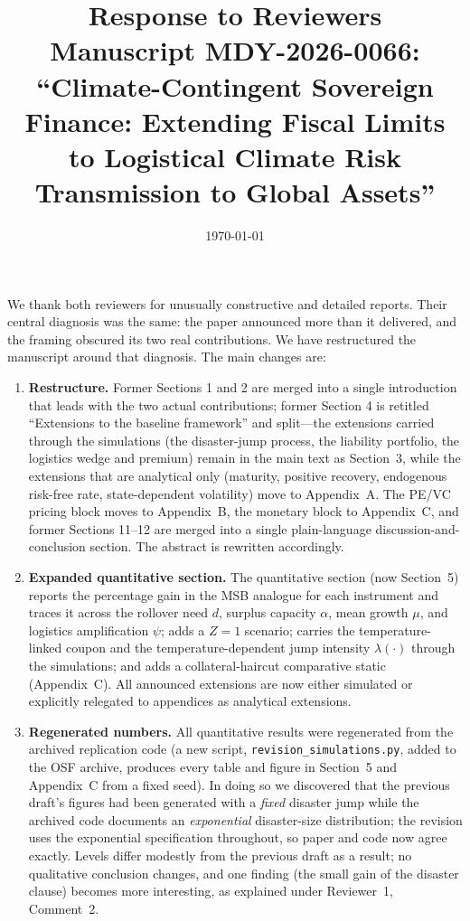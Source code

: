 \documentclass[11pt]{article}
\title{Response to Reviewers \\ \large Manuscript MDY-2026-0066: ``Climate-Contingent Sovereign Finance: Extending Fiscal Limits to Logistical Climate Risk Transmission to Global Assets''}
\date{\today}
\begin{document}
\maketitle

We thank both reviewers for unusually constructive and detailed reports. Their central diagnosis was the same: the paper announced more than it delivered, and the framing obscured its two real contributions. We have restructured the manuscript around that diagnosis. The main changes are:

\begin{enumerate}
\item \textbf{Restructure.} Former Sections 1 and 2 are merged into a single introduction that leads with the two actual contributions; former Section 4 is retitled ``Extensions to the baseline framework'' and split---the extensions carried through the simulations (the disaster-jump process, the liability portfolio, the logistics wedge and premium) remain in the main text as Section~3, while the extensions that are analytical only (maturity, positive recovery, endogenous risk-free rate, state-dependent volatility) move to Appendix~A. The PE/VC pricing block moves to Appendix~B, the monetary block to Appendix~C, and former Sections 11--12 are merged into a single plain-language discussion-and-conclusion section. The abstract is rewritten accordingly.
\item \textbf{Expanded quantitative section.} The quantitative section (now Section~5) reports the percentage gain in the MSB analogue for each instrument and traces it across the rollover need $d$, surplus capacity $\alpha$, mean growth $\mu$, and logistics amplification $\psi$; adds a $Z=1$ scenario; carries the temperature-linked coupon and the temperature-dependent jump intensity $\lambda(\cdot)$ through the simulations; and adds a collateral-haircut comparative static (Appendix~C). All announced extensions are now either simulated or explicitly relegated to appendices as analytical extensions.
\item \textbf{Regenerated numbers.} All quantitative results were regenerated from the archived replication code (a new script, \texttt{revision\_simulations.py}, added to the OSF archive, produces every table and figure in Section~5 and Appendix~C from a fixed seed). In doing so we discovered that the previous draft's figures had been generated with a \emph{fixed} disaster jump while the archived code documents an \emph{exponential} disaster-size distribution; the revision uses the exponential specification throughout, so paper and code now agree exactly. Levels differ modestly from the previous draft as a result; no qualitative conclusion changes, and one finding (the small gain of the disaster clause) becomes more interesting, as explained under Reviewer~1, Comment~2.

\end{enumerate}
\end{document}
